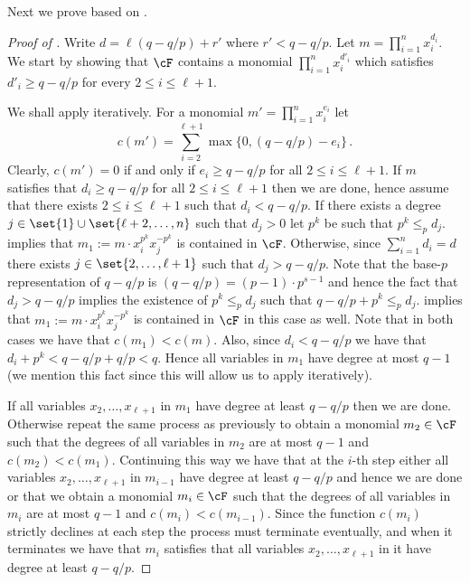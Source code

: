 Next we prove  based on .

\begin{proof}[Proof of ]
Write $d = \ell(q-q/p) + r'$ where $r' <q-q/p$. Let $m = \prod_{i=1}^{n} x_i^{d_i}$.
We start by showing that $\cF$ contains a monomial $\prod_{i=1}^{n} x_i^{d'_i}$ which satisfies $d'_i \geq q-q/p$ for every $2 \leq i \leq \ell+1$.

We shall apply  iteratively. For a monomial $m' = \prod_{i=1}^n x_i ^{e_i}$
let  $$c(m') = \sum_{i=2}^{\ell+1} \max\{0,(q-q/p)-e_i\}\,.$$ Clearly, $c(m') =0$ if and only if $e_i \geq q-q/p$ for all $2 \leq i \leq \ell+1$.
If $m$ satisfies that $d_i \geq q-q/p$ for all $2 \leq i \leq \ell+1$
 then we are done, hence assume that there exists $2 \leq i \leq \ell+1$ such that $d_i < q-q/p$.
If there exists a degree $j \in \set{1}\cup \set{\ell+2,\ldots,n}$ such that $d_j >0$ let $p^k$ be such that $p^k \leq_p d_j$.
 implies that $m_1 := m\cdot x_i^{p^k} x_j^{-p^k}$ is contained in $\cF$.  Otherwise,
since $ \sum_{i=1}^{n} d_i  = d$ there exists $j \in \set{2,\ldots,\ell+1}$ such that $d_j > q-q/p$. Note that the base-$p$ representation of $q-q/p$
is $(q-q/p) =  (p-1)\cdot p^{s-1}$ and hence the fact that $d_j > q-q/p$ implies the existence of $p^k \leq_p d_j$ such that
$q-q/p + p^k \leq_p d_j$.  implies that $m_1 := m\cdot x_i^{p^k} x_j^{-p^k}$  is contained in $\cF$ in this case as well.
Note that in both cases we have that $c(m_1) < c(m)$. Also, since $d_i < q-q/p$ we have that $d_i + p^k < q-q/p + q/p <q$. Hence all variables in $m_1$ have degree at most $q-1$ (we mention this fact since this will allow us to apply  iteratively).

If all variables $x_2,\ldots,x_{\ell+1}$ in $m_1$ have degree at least $q-q/p$
then we are done. Otherwise repeat the same process as previously to obtain a monomial $m_2 \in \cF$
such that the degrees of all variables in $m_2$ are at most $q-1$ and  $c(m_2) < c(m_1)$.
Continuing this way we have that
at the $i$-th step either all variables $x_2,\ldots,x_{\ell+1}$ in $m_{i-1}$ have degree at least $q-q/p$ and hence we are done
 or that we obtain a monomial $m_i \in \cF$ such that the degrees of all variables
in $m_i$ are at most $q-1$ and $c(m_i) < c(m_{i-1})$. Since the function $c(m_i)$ strictly declines at each step the process
must terminate eventually, and when it terminates we have that  $m_{i}$ satisfies that all variables $x_2, \ldots,x_{\ell+1}$ in it have degree at least $q-q/p$.


\end{proof}
